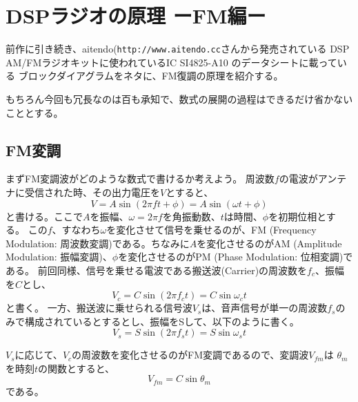 \chapter*{DSPラジオの原理 ーFM編ー}
前作に引き続き、aitendo(\texttt{http://www.aitendo.cc}さんから発売されている
DSP AM/FMラジオキットに使われているIC SI4825-A10 のデータシートに載っている
ブロックダイアグラムをネタに、FM復調の原理を紹介する。

もちろん今回も冗長なのは百も承知で、数式の展開の過程はできるだけ省かないこととする。

\section*{FM変調}
まずFM変調波がどのような数式で書けるか考えよう。
周波数$f$の電波がアンテナに受信された時、その出力電圧を$V$とすると、
\begin{equation}
V = A\sin(2 \pi f t + \phi) = A\sin(\omega t + \phi)
\end{equation}
と書ける。ここで$A$を振幅、$\omega=2\pi f$を角振動数、$t$は時間、$\phi$を初期位相とす
る。
この$f$、すなわち$\omega$を変化させて信号を乗せるのが、FM (Frequency Modulation: 周波数変調)である。ちなみに$A$を変化させるのがAM (Amplitude Modulation: 振幅変調)、$\phi$を変化させるのがPM (Phase Modulation: 位相変調)である。
前回同様、信号を乗せる電波である搬送波(Carrier)の周波数を$f_c$、振幅を$C$とし、
\begin{equation}
V_c = C\sin(2 \pi f_c t) = C\sin\omega_c t \label{eq:FM_car}
\end{equation}
と書く。
一方、搬送波に乗せられる信号波$V_s$は、音声信号が単一の周波数$f_s$のみで構成されているとするとし、振幅をSして、以下のように書く。
\begin{equation}
V_s = S\sin(2 \pi f_s t) = S\sin\omega_s t \label{eq:FM_sig}
\end{equation}

$V_s$に応じて、$V_c$の周波数を変化させるのがFM変調であるので、変調波$V_{fm}$は
$\theta_m$を時刻$t$の関数とすると、
\begin{equation}
V_{fm} = C\sin\theta_m \label{eq:FM_mod}
\end{equation}
である。

